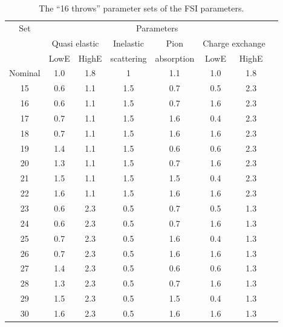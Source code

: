 \begin{table}[ht]
  \center
  \begin{tabular}{cccccccc}
    \toprule
    Set & \multicolumn{6}{c}{Parameters} \\ 
        & \multicolumn{2}{c}{Quasi elastic} & Inelastic & Pion       & \multicolumn{2}{c}{Charge exchange}\\
        & LowE  & HighE         & scattering& absorption & LowE &  HighE\\ \midrule
    Nominal  & 1.0  & 1.8   & 1      & 1.1   & 1.0  & 1.8    \\ \midrule
    15 & 0.6  & 1.1   & 1.5    & 0.7   & 0.5  & 2.3    \\
    16 & 0.6  & 1.1   & 1.5    & 0.7   & 1.6  & 2.3    \\
    17 & 0.7  & 1.1   & 1.5    & 1.6   & 0.4  & 2.3    \\
    18 & 0.7  & 1.1   & 1.5    & 1.6   & 1.6  & 2.3    \\
    19 & 1.4  & 1.1   & 1.5    & 0.6   & 0.6  & 2.3    \\
    20 & 1.3  & 1.1   & 1.5    & 0.7   & 1.6  & 2.3    \\
    21 & 1.5  & 1.1   & 1.5    & 1.5   & 0.4  & 2.3    \\
    22 & 1.6  & 1.1   & 1.5    & 1.6   & 1.6  & 2.3    \\ \midrule
    23 & 0.6  & 2.3   & 0.5    & 0.7   & 0.5  & 1.3    \\
    24 & 0.6  & 2.3   & 0.5    & 0.7   & 1.6  & 1.3    \\
    25 & 0.7  & 2.3   & 0.5    & 1.6   & 0.4  & 1.3    \\
    26 & 0.7  & 2.3   & 0.5    & 1.6   & 1.6  & 1.3    \\
    27 & 1.4  & 2.3   & 0.5    & 0.6   & 0.6  & 1.3    \\
    28 & 1.3  & 2.3   & 0.5    & 0.7   & 1.6  & 1.3    \\
    29 & 1.5  & 2.3   & 0.5    & 1.5   & 0.4  & 1.3    \\
    30 & 1.6  & 2.3   & 0.5    & 1.6   & 1.6  & 1.3    \\ \bottomrule
  \end{tabular}
  \caption[The ``16 throws'' parameter sets of the FSI parameters]{The
    ``16 throws'' parameter sets of the \Gls{FSI} parameters.}
  \label{tab:16throws}
\end{table}

